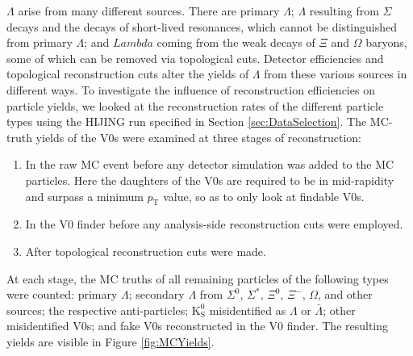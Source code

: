 $\Lambda$ arise from many different sources.
There are primary $\Lambda$; $\Lambda$ resulting from $\Sigma$ decays and the decays of short-lived resonances, which cannot be distinguished from primary $\Lambda$; and $Lambda$ coming from the weak decays of $\Xi$ and $\Omega$ baryons, some of which can be removed via topological cuts.
Detector efficiencies and topological reconstruction cuts alter the yields of $\Lambda$ from these various sources in different ways.
To investigate the influence of reconstruction efficiencies on particle yields, we looked at the reconstruction rates of the different particle types using the HIJING run specified in Section \ref{sec:DataSelection}.  
The MC-truth yields of the V0s were examined at three stages of reconstruction:
\begin{enumerate}
\item In the raw MC event before any detector simulation was added to the MC particles.  
Here the daughters of the V0s are required to be in mid-rapidity and surpass a minimum $p_\mathrm{T}$ value, so as to only look at findable V0s.
\item In the V0 finder before any analysis-side reconstruction cuts were employed.
\item After topological reconstruction cuts were made.
\end{enumerate}
At each stage, the MC truths of all remaining particles of the following types were counted: primary $\Lambda$; secondary $\Lambda$ from $\Sigma^0$, $\Sigma^*$, $\Xi^0$, $\Xi^-$, $\Omega$, and other sources; the respective anti-particles; $\mathrm{K}^0_{\mathrm{S}}$ misidentified as $\Lambda$ or $\bar{\Lambda}$; other misidentified V0s; and fake V0s reconstructed in the V0 finder.  
The resulting yields are visible in Figure \ref{fig:MCYields}.

